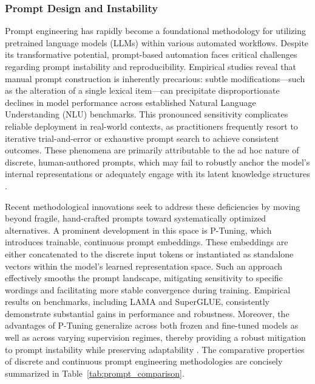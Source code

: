 \documentclass[sigconf]{acmart}
\begin{document}
\subsubsection{Prompt Design and Instability}

Prompt engineering has rapidly become a foundational methodology for utilizing pretrained language models (LLMs) within various automated workflows. Despite its transformative potential, prompt-based automation faces critical challenges regarding prompt instability and reproducibility. Empirical studies reveal that manual prompt construction is inherently precarious: subtle modifications---such as the alteration of a single lexical item---can precipitate disproportionate declines in model performance across established Natural Language Understanding (NLU) benchmarks. This pronounced sensitivity complicates reliable deployment in real-world contexts, as practitioners frequently resort to iterative trial-and-error or exhaustive prompt search to achieve consistent outcomes. These phenomena are primarily attributable to the ad hoc nature of discrete, human-authored prompts, which may fail to robustly anchor the model’s internal representations or adequately engage with its latent knowledge structures \cite{ref103}.

Recent methodological innovations seek to address these deficiencies by moving beyond fragile, hand-crafted prompts toward systematically optimized alternatives. A prominent development in this space is P-Tuning, which introduces trainable, continuous prompt embeddings. These embeddings are either concatenated to the discrete input tokens or instantiated as standalone vectors within the model’s learned representation space. Such an approach effectively smooths the prompt landscape, mitigating sensitivity to specific wordings and facilitating more stable convergence during training. Empirical results on benchmarks, including LAMA and SuperGLUE, consistently demonstrate substantial gains in performance and robustness. Moreover, the advantages of P-Tuning generalize across both frozen and fine-tuned models as well as across varying supervision regimes, thereby providing a robust mitigation to prompt instability while preserving adaptability \cite{ref103}. The comparative properties of discrete and continuous prompt engineering methodologies are concisely summarized in Table~\ref{tab:prompt_comparison}.
\end{document}
